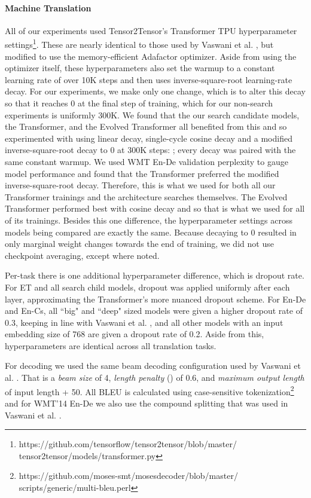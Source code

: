 \documentclass{article}
\newcommand\nohyph{\hyphenpenalty=10000\relax\exhyphenpenalty=10000\relax}
\begin{document}
\paragraph{Machine Translation} All of our experiments used Tensor2Tensor's Transformer TPU hyperparameter settings\footnote{\label{transformer_git}\nohyph https://github.com/tensorflow/tensor2tensor/blob/master/ tensor2tensor/models/transformer.py}. These are nearly identical to those used by Vaswani et al. , but modified to use the memory-efficient Adafactor \cite{shazeer18} optimizer. Aside from using the optimizer itself, these hyperparameters also set the warmup to a constant learning rate of  over 10K steps and then uses inverse-square-root learning-rate decay. For our experiments, we make only one change, which is to alter this decay so that it reaches 0 at the final step of training, which for our non-search experiments is uniformly 300K. We found that the our search candidate models, the Transformer, and the Evolved Transformer all benefited from this and so experimented with using linear decay, single-cycle cosine decay \cite{loshchilov17} and a modified inverse-square-root decay to 0 at 300K steps:  ; every decay was paired with the same constant  warmup. We used WMT En-De validation perplexity to gauge model performance and found that the Transformer preferred the modified inverse-square-root decay. Therefore, this is what we used for both all our Transformer trainings and the architecture searches themselves. The Evolved Transformer performed best with cosine decay and so that is what we used for all of its trainings. Besides this one difference, the hyperparameter settings across models being compared are exactly the same. Because decaying to 0 resulted in only marginal weight changes towards the end of training, we did not use checkpoint averaging, except where noted.

Per-task there is one additional hyperparameter difference, which is dropout rate. For ET and all search child models, dropout was applied uniformly after each layer, approximating the Transformer's more nuanced dropout scheme. For En-De and En-Cs, all ``big" and ``deep" sized models were given a higher dropout rate of 0.3, keeping in line with Vaswani et al. , and all other models with an input embedding size of 768 are given a dropout rate of 0.2. Aside from this, hyperparameters are identical across all translation tasks.

For decoding we used the same beam decoding configuration used by Vaswani et al. . That is a \textit{beam size} of 4, \textit{length penalty} () of 0.6, and \textit{maximum output length} of input length + 50. All BLEU is calculated using case-sensitive tokenization\footnote{\nohyph https://github.com/moses-smt/mosesdecoder/blob/master/ scripts/generic/multi-bleu.perl} and for WMT'14 En-De we also use the compound splitting that was used in Vaswani et al. .
\end{document}
